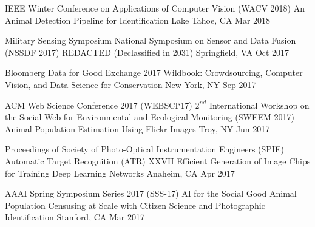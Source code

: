 

\begin{cventries}

  \cventryshort
    {IEEE Winter Conference on Applications of Computer Vision (WACV 2018)} %
    {An Animal Detection Pipeline for Identification} %
    {Lake Tahoe, CA} %
    {Mar 2018} %

  \cventryshort
    {Military Sensing Symposium \dotSep National Symposium on Sensor and Data Fusion (NSSDF 2017)} %
    {REDACTED (Declassified in 2031)} %
    {Springfield, VA} %
    {Oct 2017} %

  \cventryshort
    {Bloomberg Data for Good Exchange 2017} %
    {Wildbook: Crowdsourcing, Computer Vision, and Data Science for Conservation} %
    {New York, NY} %
    {Sep 2017} %

  \cventryshort
    {ACM Web Science Conference 2017 (WEBSCI`17) \dotSep $2^{nd}$ International Workshop on the Social Web for Environmental and Ecological Monitoring (SWEEM 2017) } %
    {Animal Population Estimation Using Flickr Images} %
    {Troy, NY} %
    {Jun 2017} %

  \cventryshort
    {Proceedings of Society of Photo-Optical Instrumentation Engineers (SPIE) \dotSep Automatic Target Recognition (ATR) XXVII} %
    {Efficient Generation of Image Chips for Training Deep Learning Networks} %
    {Anaheim, CA} %
    {Apr 2017} %

  \cventryshort
    {AAAI Spring Symposium Series 2017 (SSS-17) \dotSep AI for the Social Good} %
    {Animal Population Censusing at Scale with Citizen Science and Photographic Identification} %
    {Stanford, CA} %
    {Mar 2017} %


\end{cventries}

